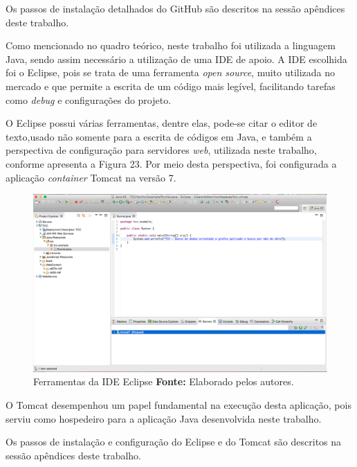 \par Os passos de instalação detalhados do GitHub são descritos na sessão apêndices deste trabalho.

\par Como mencionado no quadro teórico, neste trabalho foi utilizada a linguagem Java, sendo assim necessário a utilização de uma IDE de apoio. A IDE escolhida foi o Eclipse, pois se trata de uma ferramenta \textit{open source}, muito utilizada no mercado e que permite a escrita de um código mais legível, facilitando tarefas como \textit{debug} e configurações do projeto.

\par O Eclipse possui várias ferramentas, dentre elas, pode-se citar o editor de texto,usado não somente para a escrita de códigos em Java, e também a perspectiva de configuração para servidores \textit{web}, utilizada neste trabalho, conforme apresenta a Figura 23. Por meio desta perspectiva, foi configurada a aplicação \textit{container} Tomcat na versão 7.

\newpage
\begin{figure}[h!]
	\centerline{\includegraphics[scale=0.35]{./imagens/eclipse-editor-texto.png}}
	\caption[Ferramentas da IDE Eclipse]
	{Ferramentas da IDE Eclipse \textbf{Fonte:} Elaborado pelos autores.}
	\label{fig:exemplo1}
\end{figure}

\par O Tomcat desempenhou um papel fundamental na execução desta aplicação, pois serviu como hospedeiro para a aplicação Java desenvolvida neste trabalho. 

\par Os passos de instalação e configuração do Eclipse e do Tomcat são descritos na sessão apêndices deste trabalho.

